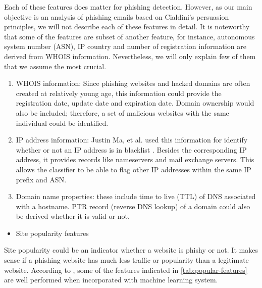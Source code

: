 Each of these features does matter for phishing detection. However,
as our main objective is an analysis of phishing emails based on Cialdini's
persuasion principles, we will not describe each of these features
in detail. It is noteworthy that some of the features are subset of
another feature, for instance, autonomous system number (ASN), IP
country and number of registration information are derived from WHOIS
information. Nevertheless, we will only explain few of them that we
assume the most crucial. 
\begin{enumerate}
\item WHOIS information: Since phishing websites and hacked domains are
often created at relatively young age, this information could provide
the registration date, update date and expiration date. Domain ownership
would also be included; therefore, a set of malicious websites with
the same individual could be identified. 
\item IP address information: Justin Ma, et al. used this information for
identify whether or not an IP address is in blacklist \citep{ma2:2009,ma:2009}.
Besides the corresponding IP address, it provides records like nameservers
and mail exchange servers. This allows the classifier to be able to
flag other IP addresses within the same IP prefix and ASN. 
\item Domain name properties: these include time to live (TTL) of DNS associated
with a hostname. PTR record (reverse DNS lookup) of a domain could
also be derived whether it is valid or not.\end{enumerate}
\begin{itemize}
\item Site popularity features
\end{itemize}
Site popularity could be an indicator whether a website is phishy
or not. It makes sense if a phishing website has much less traffic
or popularity than a legitimate website. According to \citep{xiang:2011},
some of the features indicated in \autoref{tab:popular-features}
are well performed when incorporated with machine learning system. 

